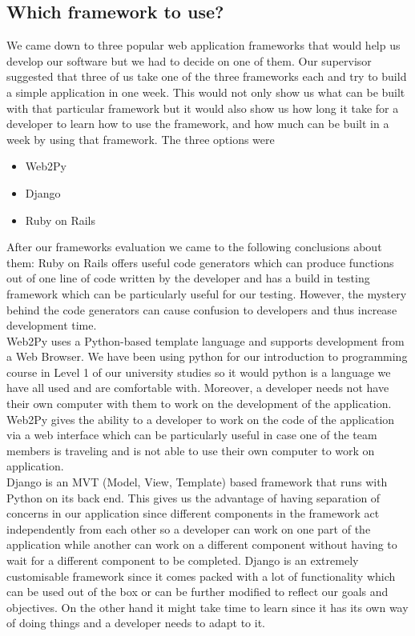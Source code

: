 \documentclass{l3proj}
\begin{document}
\subsection {Which framework to use?}
We came down to three popular web application frameworks that would help us develop 
our software but we had to decide on one of them. Our supervisor suggested that three 
of us take one of the three frameworks each and try to build a simple application in one 
week. This would not only show us what can be built with that particular framework but 
it would also show us how long it take for a developer to learn how to use the 
framework, and how much can be built in a week by using that framework. The three 
options were 
\begin{itemize}
\item Web2Py 
\item Django 
\item Ruby on Rails 
\end{itemize}
After our frameworks evaluation we came to the following conclusions about them: 
Ruby on Rails offers useful code generators which can produce functions out of one line 
of code written by the developer and has a build in testing framework which can be 
particularly useful for our testing. However, the mystery behind the code generators can 
cause confusion to developers and thus increase development time. \\
Web2Py uses a Python-based template language and supports development from a Web 
Browser. We have been using python for our introduction to programming course in Level 
1 of our university studies so it would python is a language we have all used and are 
comfortable with. Moreover, a developer needs not have their own computer with them 
to work on the development of the application. Web2Py gives the ability to a developer 
to work on the code of the application via a web interface which can be particularly 
useful in case one of the team members is traveling and is not able to use their own 
computer to work on application. \\
Django is an MVT (Model, View, Template) based framework that runs with Python on 
its back end. This gives us the advantage of having separation of concerns in our 
application since different components in the framework act independently from each 
other so a developer can work on one part of the application while another can work on 
a different component without having to wait for a different component to be completed. 
Django is an extremely customisable framework since it comes packed with a lot of 
functionality which can be used out of the box or can be further modified to reflect our 
goals and objectives. On the other hand it might take time to learn since it has its own 
way of doing things and a developer needs to adapt to it.
\end{document}
